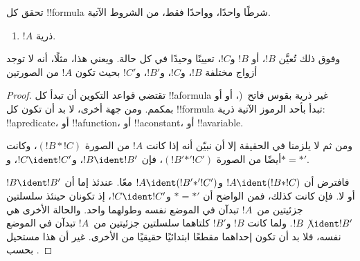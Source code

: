 \documentclass[../../../include/open-logic-section]{subfiles}
\begin{document}
\begin{prop}
تحقق كل !!{formula} شرطًا واحدًا، وواحدًا فقط، من الشروط الآتية.
\begin{enumerate}
\item $!A$ ذرية.







\end{enumerate}
وفوق ذلك تُعيَّن $!B$، أو $!B$ و$!C$، تعيينًا وحيدًا في كل حالة.
ويعني هذا، مثلًا، أنه لا توجد أزواج مختلفة $!B$، و$!C$، و$!B'$،
و$!C'$ بحيث تكون $!A$ من الصورتين
\end{prop}

\begin{proof}
تقتضي قواعد التكوين أن تبدأ كل !!a{formula} غير ذرية بقوس
فاتح~(، أو  أو بمكمم. ومن جهة أخرى،
لا بد أن تكون كل !!{formula} تبدأ بأحد الرموز الآتية ذرية:
!!a{predicate}، أو !!a{function}، أو !!a{constant}، أو
!!a{variable}.

ومن ثم لا يلزمنا في الحقيقة إلا أن نبيّن أنه إذا كانت $!A$ من
الصورة $(!B \ast !C)$، وكانت أيضًا من الصورة $(!B'
\mathbin{\ast'} !C')$، فإن $!B \ident !B'$، و$!C \ident !C'$،
و$\ast = {\ast'}$.

فافترض أن $!A \ident (!B \ast !C)$ و$!A \ident (!B'
\mathbin{\ast'} !C')$ معًا. عندئذ إما أن $!B \ident !B'$ أو لا.
فإن كانت كذلك، فمن الواضح أن $\ast = {\ast'}$ و$!C \ident !C'$،
إذ تكونان حينئذ سلسلتين جزئيتين من~$!A$ تبدآن في الموضع نفسه
وطولهما واحد. والحالة الأخرى هي $!B \not\ident !B'$. ولما كانت
$!B$ و$!B'$ كلتاهما سلسلتين جزئيتين من~$!A$ تبدآن في الموضع نفسه،
فلا بد أن تكون إحداهما مقطعًا ابتدائيًا حقيقيًا من الأخرى. غير أن
هذا مستحيل بحسب .
\end{proof}
\end{document}
